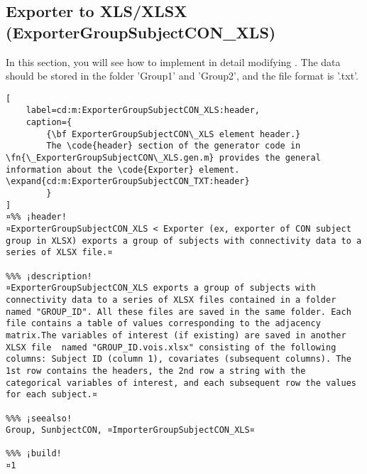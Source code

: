 \documentclass{tufte-handout}
\begin{document}
\clearpage

\subsection{Exporter to XLS/XLSX (ExporterGroupSubjectCON\_XLS)}

In this section, you will see how to implement in detail  modifying . The data should be stored in the folder 'Group1' and 'Group2', and the file format is '.txt'.

\begin{lstlisting}[
	label=cd:m:ExporterGroupSubjectCON_XLS:header,
	caption={
		{\bf ExporterGroupSubjectCON\_XLS element header.}
		The \code{header} section of the generator code in \fn{\_ExporterGroupSubjectCON\_XLS.gen.m} provides the general information about the \code{Exporter} element. \expand{cd:m:ExporterGroupSubjectCON_TXT:header}
		}
]
¤%% ¡header!
¤ExporterGroupSubjectCON_XLS < Exporter (ex, exporter of CON subject group in XLSX) exports a group of subjects with connectivity data to a series of XLSX file.¤

%%% ¡description!
¤ExporterGroupSubjectCON_XLS exports a group of subjects with connectivity data to a series of XLSX files contained in a folder named "GROUP_ID". All these files are saved in the same folder. Each file contains a table of values corresponding to the adjacency matrix.The variables of interest (if existing) are saved in another XLSX file  named "GROUP_ID.vois.xlsx" consisting of the following columns: Subject ID (column 1), covariates (subsequent columns). The 1st row contains the headers, the 2nd row a string with the categorical variables of interest, and each subsequent row the values for each subject.¤

%%% ¡seealso!
Group, SunbjectCON, ¤ImporterGroupSubjectCON_XLS¤

%%% ¡build!
¤1
\end{lstlisting}
\end{document}
